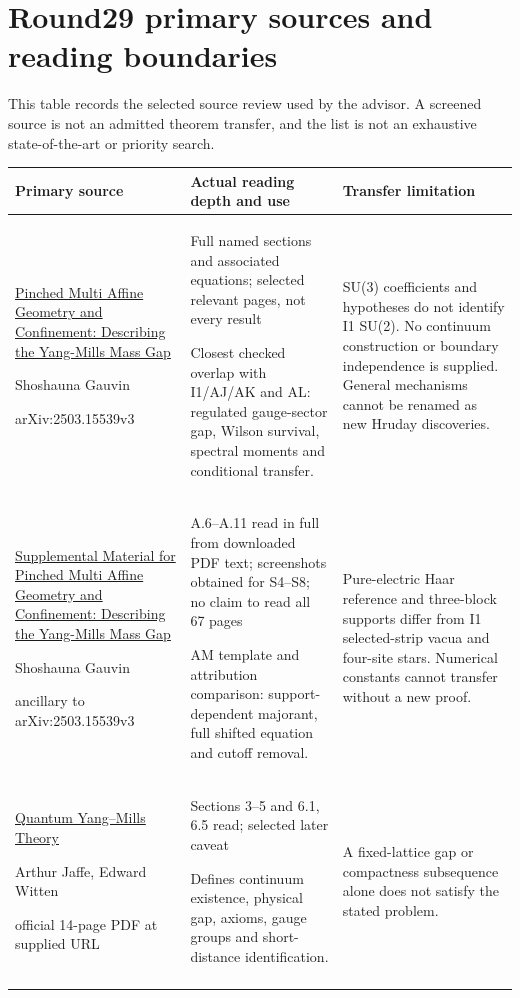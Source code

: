\section{Round29 primary sources and reading boundaries}
This table records the selected source review used by the advisor. A screened source is not an admitted theorem transfer, and the list is not an exhaustive state-of-the-art or priority search.
\begingroup\footnotesize\setlength{\tabcolsep}{4pt}
\begin{longtable}{@{}p{46mm}p{60mm}p{46mm}@{}}
\toprule Primary source & Actual reading depth and use & Transfer limitation\\\midrule\endhead
\href{https://arxiv.org/html/2503.15539v3}{Pinched Multi Affine Geometry and Confinement: Describing the Yang-Mills Mass Gap}\par Shoshauna Gauvin\par arXiv:2503.15539v3 & Full named sections and associated equations; selected relevant pages, not every result\par Closest checked overlap with I1/AJ/AK and AL: regulated gauge-sector gap, Wilson survival, spectral moments and conditional transfer. & SU(3) coefficients and hypotheses do not identify I1 SU(2). No continuum construction or boundary independence is supplied. General mechanisms cannot be renamed as new Hruday discoveries.\\\addlinespace
\href{https://arxiv.org/src/2503.15539v3/anc/PinchedMultiAffineGeometry_Supplement.pdf}{Supplemental Material for Pinched Multi Affine Geometry and Confinement: Describing the Yang-Mills Mass Gap}\par Shoshauna Gauvin\par ancillary to arXiv:2503.15539v3 & A.6--A.11 read in full from downloaded PDF text; screenshots obtained for S4--S8; no claim to read all 67 pages\par AM template and attribution comparison: support-dependent majorant, full shifted equation and cutoff removal. & Pure-electric Haar reference and three-block supports differ from I1 selected-strip vacua and four-site stars. Numerical constants cannot transfer without a new proof.\\\addlinespace
\href{https://www.claymath.org/wp-content/uploads/2022/06/yangmills.pdf}{Quantum Yang--Mills Theory}\par Arthur Jaffe, Edward Witten\par official 14-page PDF at supplied URL & Sections 3--5 and 6.1, 6.5 read; selected later caveat\par Defines continuum existence, physical gap, axioms, gauge groups and short-distance identification. & A fixed-lattice gap or compactness subsequence alone does not satisfy the stated problem.\\\addlinespace

\end{longtable}
